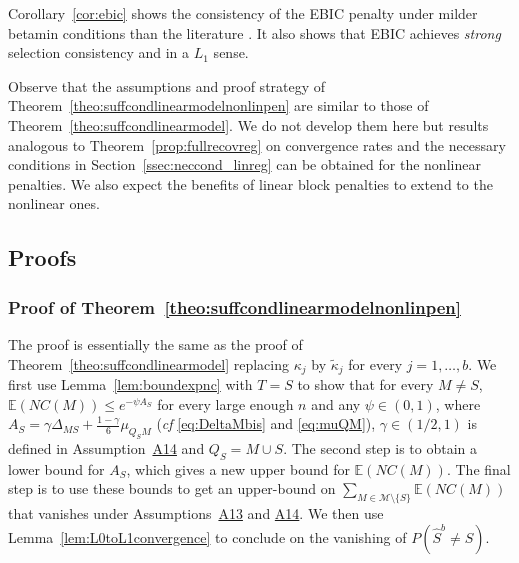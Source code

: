 \documentclass[bj,authoryear]{imsart}
\theoremstyle{plain}
\newcommand{\E}{\mathbb{E}}
\newcommand{\M}{\mathcal{M}}
\begin{document}
Corollary~\ref{cor:ebic} shows the consistency of the EBIC penalty under milder betamin conditions than the literature \cite{EBIC,ebicdiverging}. It also shows that EBIC achieves \emph{strong} selection consistency and in a $L_1$ sense.

Observe that the assumptions and proof strategy of Theorem~\ref{theo:suffcondlinearmodelnonlinpen} are similar to those of Theorem~\ref{theo:suffcondlinearmodel}. We do not develop them here but results analogous to Theorem~\ref{prop:fullrecovreg} on convergence rates and the necessary conditions in Section~\ref{ssec:neccond_linreg} can be obtained for the nonlinear penalties. We also expect the benefits of linear block penalties to extend to the nonlinear ones.

\subsection{Proofs}
\subsubsection{Proof of Theorem~\ref{theo:suffcondlinearmodelnonlinpen}}
The proof is essentially the same as the proof of Theorem~\ref{theo:suffcondlinearmodel} replacing $\kappa_j$ by $\tilde{\kappa}_{j}$ for every $j=1,\ldots,b$. We first use Lemma~\ref{lem:boundexpnc} with $T = S$ to show that for every $M\neq S$, $\E(NC(M)) \leq e^{-\psi A_S}$ for every large enough $n$ and any $\psi \in (0,1)$, where $A_S=\gamma\Delta_{MS}+\tfrac{1-\gamma}{6}\mu_{Q_SM}$ (\emph{cf} \eqref{eq:DeltaMbis} and \eqref{eq:muQM}), $\gamma\in(1/2,1)$ is defined in Assumption~\hyperlink{lab:A14}{A14} and $Q_S= M\cup S$.
The second step is to obtain a lower bound for $A_S$, which gives a new upper bound for $\E(NC(M))$.
The final step is to use these bounds to get an upper-bound on $\sum_{M \in \M\setminus \{S\}} \E\left(NC(M)\right)$ that vanishes under Assumptions~\hyperlink{lab:A13}{A13} and \hyperlink{lab:A14}{A14}. We then use Lemma~\ref{lem:L0toL1convergence} to conclude on the vanishing of $P(\hat S^b \neq S)$. 
\end{document}
